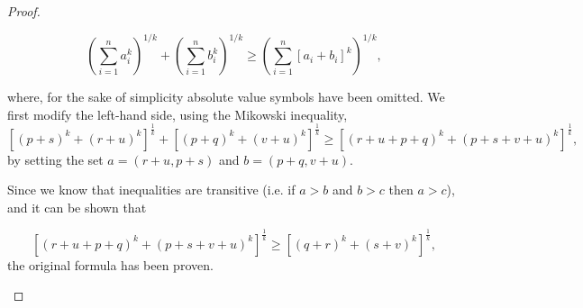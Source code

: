 \begin{proof}
\begin{itemize}
\[
 \left(\sum\limits_{i=1}^{n}  a_{i}^k \right)^{1/k} + \left(\sum\limits_{i=1}^{n}  b_{i}^k \right)^{1/k} \geq \left( \sum\limits_{i=1}^{n} \left[ a_{i} + b_{i} \right]^{k} \right)^{1/k}, 
\]

where, for the sake of simplicity absolute value symbols have been omitted.  We first modify the left-hand side, using the Mikowski inequality,
\[
\left[\left(p+s\right)^{k}+\left(r+u\right)^{k}\right]^{\frac{1}{k}}+\left[\left(p+q\right)^{k}+\left(v+u\right)^{k}\right]^{\frac{1}{k}}\geq\left[\left(r+u+p+q\right)^{k} +  \left(p+s+v+u\right)^{k} \right]^{\frac{1}{k}},
\]
by setting the set $a = ( r+u , p+s )$ and $b = ( p+q, v+u )$.

Since we know that inequalities are transitive (i.e. if $a>b$ and $b>c$ then $a>c$), and it can be shown that

\[
\left[\left(r+u+p+q\right)^{k} +  \left(p+s+v+u\right)^{k} \right]^{\frac{1}{k}}\geq\left[\left(q+r\right)^{k}+\left(s+v\right)^{k}\right]^{\frac{1}{k}},
\]
the original formula has been proven.


\end{itemize}
\end{proof}

